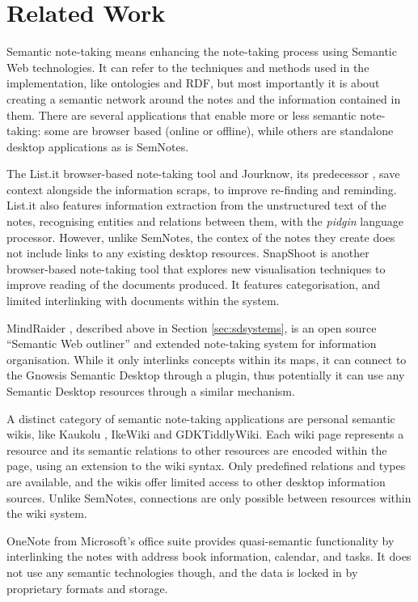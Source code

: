 \section{Related Work}
\label{sec:notetakingapps}

Semantic note-taking means enhancing the note-taking process using Semantic Web technologies. It can refer to the techniques and methods used in the implementation, like ontologies and RDF, but most importantly it is about creating a semantic network around the notes and the information contained in them. There are several applications that enable more or less semantic note-taking: some are browser based (online or offline), while others are standalone desktop applications as is SemNotes. 

The List.it browser-based note-taking tool \cite{Kleek2009} and Jourknow, its predecessor \cite{Kleek2007}, save context alongside the information scraps, to improve re-finding and reminding. List.it also features information extraction from the unstructured text of the notes, recognising entities and relations between them, with the \emph{pidgin} language processor. However, unlike SemNotes, the contex of the notes they create does not include links to any existing desktop resources. SnapShoot \cite{Iga2006} is another browser-based note-taking tool that explores new visualisation techniques to improve reading of the documents produced. It features categorisation, and limited interlinking with documents within the system.

MindRaider \cite{MindRaider}, described above in Section \ref{sec:sdsystems}, is an open source ``Semantic Web outliner'' and extended note-taking system for information organisation. While it only interlinks concepts within its maps, it can connect to the Gnowsis Semantic Desktop through a plugin, thus potentially it can use any Semantic Desktop resources through a similar mechanism.

A distinct category of semantic note-taking applications are personal semantic wikis, like Kaukolu \cite{Elst2008}, IkeWiki \cite{Schaffert2006} and GDKTiddlyWiki. Each wiki page represents a resource and its semantic relations to other resources are encoded within the page, using an extension to the wiki syntax. Only predefined relations and types are available, and the wikis offer limited access to other desktop information sources. Unlike SemNotes, connections are only possible between resources within the wiki system.

OneNote from Microsoft's office suite provides quasi-se\-man\-tic functionality by interlinking the notes with address book information, calendar, and tasks. It does not use any semantic technologies though, and the data is locked in by proprietary formats and storage.

